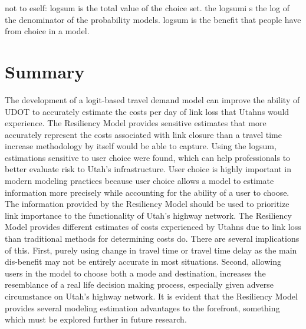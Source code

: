not to eself: logsum is the total value of the choice set. the logsumi s the log of the denominator of the probability models. logsum is the benefit that people have from choice in a model.



\section{Summary}

The development of a logit-based travel demand model can improve the
ability of UDOT to accurately estimate the costs per day of link loss that
Utahns would experience. The Resiliency Model provides sensitive
estimates that more accurately represent the costs associated with link
closure than a travel time increase methodology by itself would be able to
capture. Using the logsum, estimations sensitive to user choice were
found, which can help professionals to better evaluate risk to Utah’s
infrastructure. User choice is highly important in modern modeling
practices because user choice allows a model to estimate information more
precisely while accounting for the ability of a user to choose. The information
provided by the Resiliency Model
should be used to prioritize link importance to the functionality of
Utah’s highway network. The Resiliency Model provides different estimates of
costs experienced by Utahns due to link loss than traditional methods for
determining costs do. There are several implications of this. First, purely
using change in travel time or travel time delay as the main dis-benefit may not
be entirely accurate in most situations. Second, allowing users in the model
to choose both a mode and destination, increases the resemblance of a real life
decision making process, especially given adverse circumstance on Utah's
highway network. It is evident that the Resiliency Model provides several
modeling estimation advantages to the forefront, something which must be
explored further in future research.
